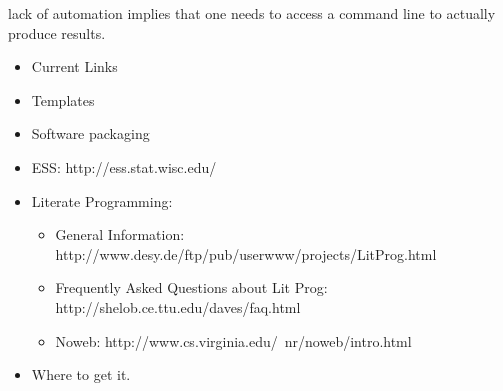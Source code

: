 \documentclass[semhelv]{seminar}
\begin{document}
lack of automation implies that one needs to access a command line to
actually produce results.
 
\begin{itemize}
\item Current Links
\end{itemize}

\begin{slide}

\end{slide}

\begin{itemize}
\item Templates
\item Software packaging
\end{itemize}

\begin{slide}

  \begin{itemize}
  \item ESS: http://ess.stat.wisc.edu/
  \item Literate Programming:
    \begin{itemize}
    \item General Information:
      http://www.desy.de/ftp/pub/userwww/projects/LitProg.html 
    \item %
      Frequently Asked Questions about Lit Prog: http://shelob.ce.ttu.edu/daves/faq.html
    \item %
      Noweb: http://www.cs.virginia.edu/~nr/noweb/intro.html
    \end{itemize}
  \end{itemize}
\end{slide}

\begin{itemize}
\item Where to get it.
\end{itemize}
\end{document}
